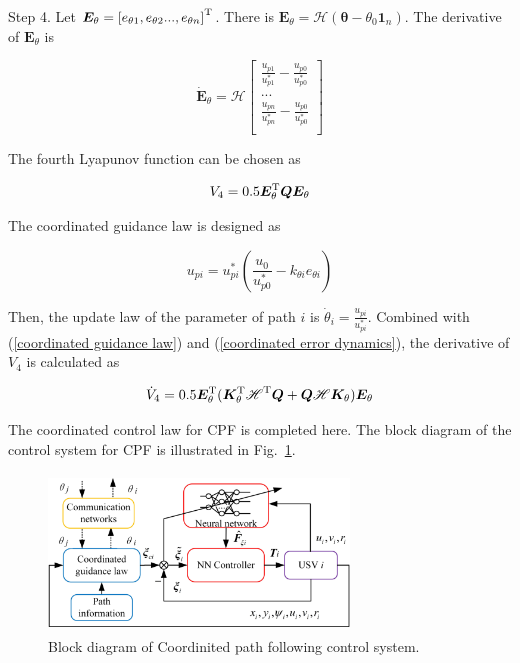 \documentclass[conference,letterpaper,10.5pt]{IEEEtran}
\begin{document}
Step 4. Let $\bm{E}_\theta=\left[e_{\theta 1},e_{\theta 2}...,e_{\theta n}\right]^{\rm T}$. There is $\bm{E}_\theta=\boldsymbol{\mathcal{H}}(\bm{\theta}-\theta_0\bm{1}_n)$. The derivative of $\bm{E}_\theta$ is

\begin{equation}\label{coordinated error dynamics}
	\dot{\bm{E}}_\theta=\boldsymbol{\mathcal{H}}
	\begin{bmatrix}
		\frac{u_{p1}}{u^*_{p1}}-\frac{u_{p0}}{u^*_{p0}}\\
		...\\
		\frac{u_{pn}}{u^*_{pn}}-\frac{u_{p0}}{u^*_{p0}}\\
	\end{bmatrix}
\end{equation}

The fourth Lyapunov function can be chosen as

\begin{equation}
	V_4=0.5\bm{E}^{\rm T}_\theta \bm{Q} \bm{E}_\theta
\end{equation}

The coordinated guidance law is designed as

\begin{equation}\label{coordinated guidance law}
	u_{pi}=u^{*}_{pi}(\frac{u_0}{u^*_{p0}}-k_{\theta i}e_{\theta i})
\end{equation}

Then, the update law of the parameter of path $i$ is $\dot{\theta}_i=\frac{u_{pi}}{u^*_{pi}}$. Combined with (\ref{coordinated guidance law}) and (\ref{coordinated error dynamics}), the derivative of $V_4$ is calculated as

\begin{equation}\label{V4dot}
	\dot{V}_4=0.5\bm{E}^{\rm T}_\theta(\bm{K}^{\rm T}_\theta \boldsymbol{\mathscr{H}}^{\rm T}\bm{Q}+\bm{Q}\boldsymbol{\mathscr{H}}\bm{K}_\theta)\bm{E}_\theta
\end{equation} 

The coordinated control law for CPF is completed here. The block diagram of the control system for CPF is illustrated in Fig.~\ref{CPFCS}.

\begin{figure}[!htb]
	\centering
	\includegraphics[width=8cm, height=4.2cm]{CPFCS.eps}
	\caption{Block diagram of Coordinited path following control system.}
	\label{CPFCS}
\end{figure}
\end{document}
